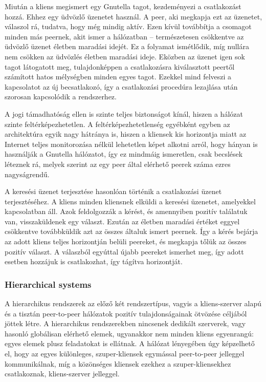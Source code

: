 \documentclass[a4paper]{article}
\begin{document}
Miután a kliens megismert egy Gnutella tagot, kezdeményezi a csatlakozást hozzá. Ehhez egy üdvözlő üzenetet használ. A peer, aki megkapja ezt az üzenetet, válaszol rá, tudatva, hogy még mindig aktív. Ezen kívül továbbítja a csomagot minden más peernek, akit ismer a hálózatban – természetesen csökkentve az üdvözlő üzenet életben maradási idejét. Ez a folyamat ismétlődik, míg nullára nem csökken az üdvözlés életben maradási ideje. Eközben az üzenet igen sok tagot látogatott meg, tulajdonképpen a csatlakozásra kiválasztott peertől számított hatos mélységben minden egyes tagot. Ezekkel mind felveszi a kapcsolatot az új becsatlakozó, így a csatlakozási procedúra lezajlása után szorosan kapcsolódik a rendszerhez.

A jogi támadhatóság ellen is szinte teljes biztonságot kínál, hiszen a hálózat szinte feltérképezhetetlen. A feltérképezhetetlenség egyébként egyben az architektúra egyik nagy hátránya is, hiszen a kliensek kis horizontja miatt az Internet teljes monitorozása nélkül lehetetlen képet alkotni arról, hogy hányan is használják a Gnutella hálózatot, így ez mindmáig ismeretlen, csak becslések léteznek rá, melyek szerint az egy peer által elérhető peerek száma ezres nagyságrendű.

A keresési üzenet terjesztése hasonlóan történik a csatlakozási üzenet terjesztéséhez. A kliens minden kliensnek elküldi a keresési üzenetet, amelyekkel kapcsolatban áll. Azok feldolgozzák a kérést, és amennyiben pozitív találatuk van, visszaküldenek egy választ. Ezután az életben maradási értéket eggyel csökkentve továbbküldik azt az összes általuk ismert peernek. Így a kérés bejárja az adott kliens teljes horizontján belüli peereket, és megkapja tőlük az összes pozitív választ. A válaszból egyúttal újabb peereket ismerhet meg, így adott esetben hozzájuk is csatlakozhat, így tágítva horizontját.

\subsubsection{Hierarchical systems}

A hierarchikus rendszerek az előző két rendszertípus, vagyis a kliens-szerver alapú és a tisztán peer-to-peer hálózatok pozitív tulajdonságainak ötvözése céljából jöttek létre. A hierarchikus rendszerekben nincsenek dedikált szerverek, vagy hasonló globálisan elérhető elemek, ugyanakkor nem minden kliens egyenrangú: egyes elemek plusz feladatokat is ellátnak. A hálózat lényegében úgy képzelhető el, hogy az egyes különleges, szuper-kliensek egymással peer-to-peer jelleggel kommunikálnak, míg a közönséges kliensek ezekhez a szuper-kliensekhez csatlakoznak, kliens-szerver jelleggel.
\end{document}
